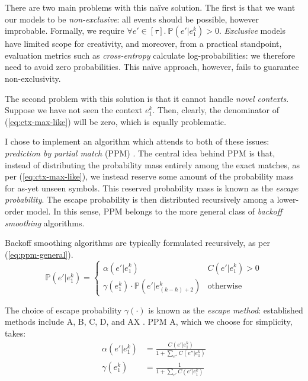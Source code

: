 \documentclass[12pt,a4paper,twoside,openright]{report}
\begin{document}
There are two main problems with this naïve solution. The first is that we want
our models to be \emph{non-exclusive}: all events should be possible, however
improbable. Formally, we require $\forall e' \in [\tau].\ \mathbb{P}(e' | e_1^k)
> 0$. \emph{Exclusive} models have limited scope for creativity, and moreover,
from a practical standpoint, evaluation metrics such as \emph{cross-entropy}
calculate log-probabilities: we therefore need to avoid zero probabilities. This
naïve approach, however, fails to guarantee non-exclusivity.

The second problem with this solution is that it cannot handle \emph{novel
contexts}. Suppose we have not seen the context $e_1^k$. Then, clearly, the
denominator of (\ref{eq:ctx-max-like}) will be zero, which is equally
problematic.

I chose to implement an algorithm which attends to both of these issues:
\emph{prediction by partial match} (PPM) \cite{cleary1984ppm}. The central idea
behind PPM is that, instead of distributing the probability mass entirely among
the exact matches, as per (\ref{eq:ctx-max-like}), we instead reserve some
amount of the probability mass for as-yet unseen symbols. This reserved
probability mass is known as the \emph{escape probability}. The escape
probability is then distributed recursively among a lower-order model. In this
sense, PPM belongs to the more general class of \emph{backoff smoothing}
algorithms.

Backoff smoothing algorithms are typically formulated recursively, as per
(\ref{eq:ppm-general}).
\begin{equation}\label{eq:ppm-general}
  \mathbb{P}(e' | e_1^k) = \begin{cases}
  \alpha(e'|e_1^k) & C(e' | e_1^k) > 0 \\
\gamma(e_1^k) \cdot \mathbb{P}(e' | e_{(k - \hbar) + 2}^k) & \text{otherwise}
\end{cases} 
\end{equation} 

The choice of escape probability $\gamma(\cdot)$ is known as the \emph{escape
method}: established methods include A, B, C, D, and AX
\cite{pearce2004improved}. PPM A, which we choose for simplicity, takes:
\begin{align}
  \label{eq:ppm-a-alpha}
  \alpha(e' | e_1^k) &= \frac{ C(e' | e_1^k) }{ 1 + \sum_{e''} C(e'' | e_1^k) }
  \\
  \gamma(e_1^k) &= \frac{ 1 }{ 1 + \sum_{e'} C(e' | e_1^k) }
  \label{eq:ppm-a-gamma}
\end{align}
\end{document}
